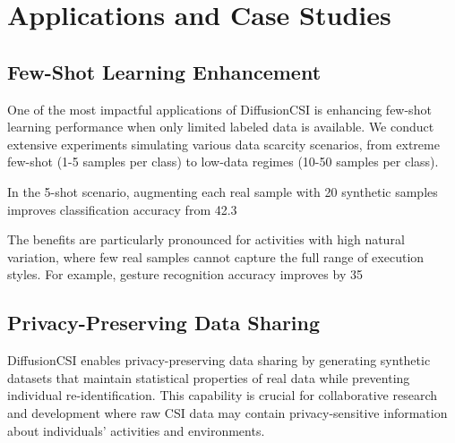 \documentclass[journal]{IEEEtran}
\begin{document}
\section{Applications and Case Studies}

\subsection{Few-Shot Learning Enhancement}

One of the most impactful applications of DiffusionCSI is enhancing few-shot learning performance when only limited labeled data is available. We conduct extensive experiments simulating various data scarcity scenarios, from extreme few-shot (1-5 samples per class) to low-data regimes (10-50 samples per class).

In the 5-shot scenario, augmenting each real sample with 20 synthetic samples improves classification accuracy from 42.3%

The benefits are particularly pronounced for activities with high natural variation, where few real samples cannot capture the full range of execution styles. For example, gesture recognition accuracy improves by 35%

\subsection{Privacy-Preserving Data Sharing}

DiffusionCSI enables privacy-preserving data sharing by generating synthetic datasets that maintain statistical properties of real data while preventing individual re-identification. This capability is crucial for collaborative research and development where raw CSI data may contain privacy-sensitive information about individuals' activities and environments.
\end{document}
